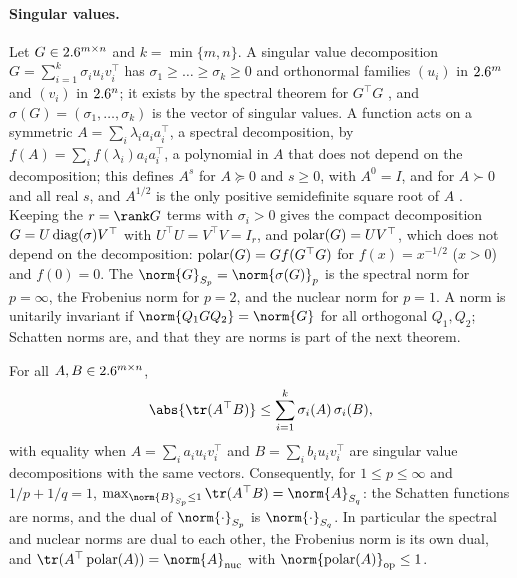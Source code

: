 \begin{refsection}
\paragraph{Singular values.} Let $G\in2.6^{m\times n}$ and $k=\min\{m,n\}$. A singular value decomposition $G=\sum_{i=1}^k\sigma_iu_iv_i^\top$ has $\sigma_1\ge\dots\ge\sigma_k\ge0$ and orthonormal families $(u_i)$ in $2.6^m$ and $(v_i)$ in $2.6^n$; it exists by the spectral theorem for $G^\top G$ \parencite{HornJohnson2013}, and $\sigma(G)=(\sigma_1,\dots,\sigma_k)$ is the vector of singular values. A function acts on a symmetric $A=\sum_i\lambda_ia_ia_i^\top$, a spectral decomposition, by $f(A)=\sum_if(\lambda_i)a_ia_i^\top$, a polynomial in $A$ that does not depend on the decomposition; this defines $A^s$ for $A\succeq0$ and $s\ge0$, with $A^0=I$, and for $A\succ0$ and all real $s$, and $A^{1/2}$ is the only positive semidefinite square root of $A$ \parencite{HornJohnson2013}. Keeping the $r=\rank G$ terms with $\sigma_i>0$ gives the compact decomposition $G=U\operatorname{diag}(\sigma)V^\top$ with $U^\top U=V^\top V=I_r$, and $\operatorname{polar}(G)=UV^\top$, which does not depend on the decomposition: $\operatorname{polar}(G)=Gf(G^\top G)$ for $f(x)=x^{-1/2}$ ($x>0$) and $f(0)=0$. The  $\norm{G}_{S_p}=\norm{\sigma(G)}_p$ is the spectral norm for $p=\infty$, the Frobenius norm for $p=2$, and the nuclear norm for $p=1$. A norm is unitarily invariant if $\norm{Q_1GQ_2}=\norm{G}$ for all orthogonal $Q_1,Q_2$; Schatten norms are, and that they are norms is part of the next theorem.

\begin{theorem}\label{thm:toolkit:vonneumann}
For all $A,B\in2.6^{m\times n}$,
\begin{equation}\label{eq:toolkit:vn}
  \abs{\tr(A^\top B)}\le\sum_{i=1}^k\sigma_i(A)\,\sigma_i(B),
\end{equation}
with equality when $A=\sum_ia_iu_iv_i^\top$ and $B=\sum_ib_iu_iv_i^\top$ are singular value decompositions with the same vectors. Consequently, for $1\le p\le\infty$ and $1/p+1/q=1$, $\max_{\norm{B}_{S_p}\le1}\tr(A^\top B)=\norm{A}_{S_q}$: the Schatten functions are norms, and the dual of $\norm{\cdot}_{S_p}$ is $\norm{\cdot}_{S_q}$. In particular the spectral and nuclear norms are dual to each other, the Frobenius norm is its own dual, and $\tr(A^\top\polar(A))=\norm{A}_{\nuc}$ with $\norm{\polar(A)}_{\op}\le1$.
\end{theorem}


\end{refsection}
